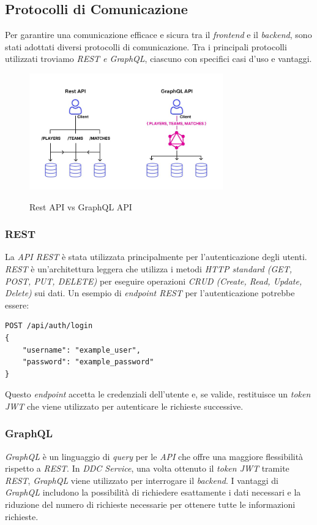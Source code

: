 \subsection{Protocolli di Comunicazione}
\label{subsec:protocolli_comunicazione}

Per garantire una comunicazione efficace e sicura tra il \textit{frontend} e il \textit{backend}, sono stati adottati diversi protocolli di comunicazione.
Tra i principali protocolli utilizzati troviamo \textit{REST e \textit{GraphQL}}, ciascuno con specifici casi d'uso e vantaggi.

\begin{figure}[H]
    \centering
    \includegraphics[alt={Rappresentazione grafica della struttura e differenza tra rest api e graphqlapi}, height=5cm]{img/restgraphql.png}
    \caption{Rest API vs GraphQL API}
    \label{fig:backendfrontend}
\end{figure}

\subsubsection{REST}
La \textit{API REST} è stata utilizzata principalmente per l'autenticazione degli utenti.
\textit{REST} è un'architettura leggera che utilizza i metodi \textit{HTTP standard (GET, POST, PUT, DELETE)} per eseguire operazioni \textit{CRUD (Create, Read, Update, Delete)} sui dati.
Un esempio di \textit{endpoint REST} per l'autenticazione potrebbe essere:
\begin{verbatim}
POST /api/auth/login
{
    "username": "example_user",
    "password": "example_password"
}
\end{verbatim}

Questo \textit{endpoint} accetta le credenziali dell'utente e, se valide, restituisce un \textit{token JWT} che viene utilizzato per autenticare le richieste successive.

\subsubsection{GraphQL}
\textit{GraphQL} è un linguaggio di \textit{query} per le \textit{API} che offre una maggiore flessibilità rispetto a \textit{REST}.
In \textit{DDC Service}, una volta ottenuto il \textit{token JWT} tramite \textit{REST}, \textit{GraphQL} viene utilizzato per interrogare il \textit{backend}.
I vantaggi di \textit{GraphQL} includono la possibilità di richiedere esattamente i dati necessari e la riduzione del numero di richieste necessarie per ottenere tutte le informazioni richieste.

